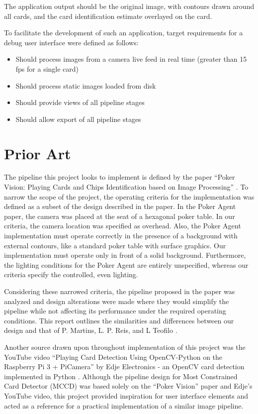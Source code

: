 \documentclass[conference]{IEEEtran}
\begin{document}
The application output should be the original image, with contours drawn around all cards, and the
card identification estimate overlayed on the card.

To facilitate the development of such an application, target requirements for a debug user interface
were defined as follows:
\begin{itemize}
    \item Should process images from a camera live feed in real time (greater than 15 fps for a
        single card)
    \item Should process static images loaded from disk
    \item Should provide views of all pipeline stages
    \item Should allow export of all pipeline stages
\end{itemize}


\section{Prior Art}
The pipeline this project looks to implement is defined by the paper ``Poker Vision: Playing Cards
and Chips Identification based on Image Processing'' \cite{poker-vision}. To narrow the scope of the
project, the operating criteria for the implementation was defined as a subset of the design
described in the paper. In the Poker Agent paper, the camera was placed at the seat of a hexagonal
poker table. In our criteria, the camera location was specified as overhead. Also, the Poker Agent
implementation must operate correctly in the presence of a background with external contours, like a
standard poker table with surface graphics. Our implementation must operate only in front of a solid
background. Furthermore, the lighting conditions for the Poker Agent are entirely unspecified,
whereas our criteria specify the controlled, even lighting.

Considering these narrowed criteria, the pipeline proposed in the paper was analyzed and design
alterations were made where they would simplify the pipeline while not affecting its performance
under the required operating conditions. This report outlines the similarities and differences
between our design and that of P. Martins, L. P. Reis, and L Teofilo \cite{poker-vision}.

Another source drawn upon throughout implementation of this project was the YouTube video ``Playing
Card Detection Using OpenCV-Python on the Raspberry Pi 3 + PiCamera'' by Edje Electronics - an
OpenCV card detection implemented in Python \cite{opencv-card-detection}. Although the pipeline
design for Most Constrained Card Detector (MCCD) was based solely on the ``Poker Vision'' paper and
Edje's YouTube video, this project provided inspiration for user interface elements and acted as a
reference for a practical implementation of a similar image pipeline.
\end{document}
